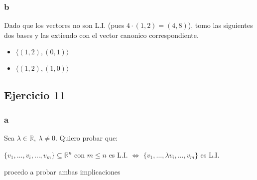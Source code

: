 \documentclass{article}
\begin{document}
\subsubsection*{b}

Dado que los vectores no son L.I. (pues $4\cdot(1,2) = (4,8)$), 
tomo las siguientes dos bases y las extiendo con el vector canonico correspondiente.
\begin{itemize}
    \item $\langle (1,2), (0,1) \rangle$
    \item $\langle (1,2), (1,0) \rangle$
\end{itemize}

\subsection*{Ejercicio 11}

\subsubsection*{a}

Sea $\lambda \in \mathbb{R},~ \lambda \neq 0$. Quiero probar que:

\begin{center}
    $\{v_1,\ldots,v_i,\ldots,v_m\} \subseteq \mathbb{R}^{n}$ con $m \leq n$ es L.I. 
    $\iff$ 
    $\{v_1,\ldots,\lambda v_i,\ldots,v_m\}$ es L.I.
\end{center}

\noindent procedo a probar ambas implicaciones
\end{document}
